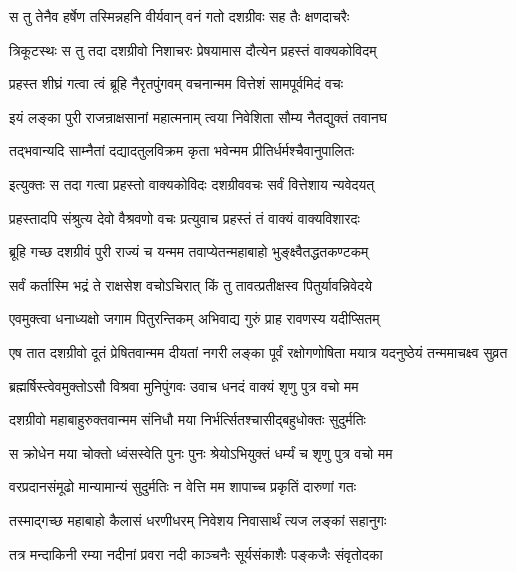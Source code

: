 \twolineshloka
{स तु तेनैव हर्षेण तस्मिन्नहनि वीर्यवान्}
{वनं गतो दशग्रीवः सह तैः क्षणदाचरैः} %

\twolineshloka
{त्रिकूटस्थः स तु तदा दशग्रीवो निशाचरः}
{प्रेषयामास दौत्येन प्रहस्तं वाक्यकोविदम्} %

\twolineshloka
{प्रहस्त शीघ्रं गत्वा त्वं ब्रूहि नैरृतपुंगवम्}
{वचनान्मम वित्तेशं सामपूर्वमिदं वचः} %

\twolineshloka
{इयं लङ्का पुरी राजन्राक्षसानां महात्मनाम्}
{त्वया निवेशिता सौम्य नैतद्युक्तं तवानघ} %

\twolineshloka
{तद्भवान्यदि साम्नैतां दद्यादतुलविक्रम}
{कृता भवेन्मम प्रीतिर्धर्मश्चैवानुपालितः} %

\twolineshloka
{इत्युक्तः स तदा गत्वा प्रहस्तो वाक्यकोविदः}
{दशग्रीववचः सर्वं वित्तेशाय न्यवेदयत्} %

\twolineshloka
{प्रहस्तादपि संश्रुत्य देवो वैश्रवणो वचः}
{प्रत्युवाच प्रहस्तं तं वाक्यं वाक्यविशारदः} %

\twolineshloka
{ब्रूहि गच्छ दशग्रीवं पुरी राज्यं च यन्मम}
{तवाप्येतन्महाबाहो भुङ्क्ष्वैतद्धतकण्टकम्} %

\twolineshloka
{सर्वं कर्तास्मि भद्रं ते राक्षसेश वचोऽचिरात्}
{किं तु तावत्प्रतीक्षस्व पितुर्यावन्निवेदये} %

\twolineshloka
{एवमुक्त्वा धनाध्यक्षो जगाम पितुरन्तिकम्}
{अभिवाद्य गुरुं प्राह रावणस्य यदीप्सितम्} %

\threelineshloka
{एष तात दशग्रीवो दूतं प्रेषितवान्मम}
{दीयतां नगरी लङ्का पूर्वं रक्षोगणोषिता}
{मयात्र यदनुष्ठेयं तन्ममाचक्ष्व सुव्रत} %

\twolineshloka
{ब्रह्मर्षिस्त्वेवमुक्तोऽसौ विश्रवा मुनिपुंगवः}
{उवाच धनदं वाक्यं शृणु पुत्र वचो मम} %

\twolineshloka
{दशग्रीवो महाबाहुरुक्तवान्मम संनिधौ}
{मया निर्भर्त्सितश्चासीद्बहुधोक्तः सुदुर्मतिः} %

\twolineshloka
{स क्रोधेन मया चोक्तो ध्वंसस्वेति पुनः पुनः}
{श्रेयोऽभियुक्तं धर्म्यं च शृणु पुत्र वचो मम} %

\twolineshloka
{वरप्रदानसंमूढो मान्यामान्यं सुदुर्मतिः}
{न वेत्ति मम शापाच्च प्रकृतिं दारुणां गतः} %

\twolineshloka
{तस्माद्गच्छ महाबाहो कैलासं धरणीधरम्}
{निवेशय निवासार्थं त्यज लङ्कां सहानुगः} %

\twolineshloka
{तत्र मन्दाकिनी रम्या नदीनां प्रवरा नदी}
{काञ्चनैः सूर्यसंकाशैः पङ्कजैः संवृतोदका} %

